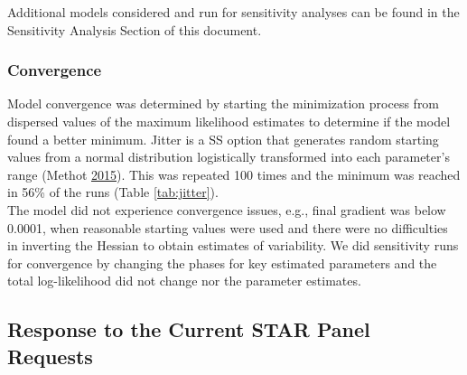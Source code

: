 \documentclass[12pt,]{article}
\begin{document}
Additional models considered and run for sensitivity analyses can be
found in the Sensitivity Analysis Section of this document.

\subsubsection{Convergence}\label{convergence}

Model convergence was determined by starting the minimization process
from dispersed values of the maximum likelihood estimates to determine
if the model found a better minimum. Jitter is a SS option that
generates random starting values from a normal distribution logistically
transformed into each parameter's range (Methot
\protect\hyperlink{ref-Methot2015}{2015}). This was repeated 100 times
and the minimum was reached in 56\% of the runs (Table
\ref{tab:jitter}).\\
The model did not experience convergence issues, e.g., final gradient
was below 0.0001, when reasonable starting values were used and there
were no difficulties in inverting the Hessian to obtain estimates of
variability. We did sensitivity runs for convergence by changing the
phases for key estimated parameters and the total log-likelihood did not
change nor the parameter estimates.

\subsection{Response to the Current STAR Panel
Requests}\label{response-to-the-current-star-panel-requests}
\end{document}

